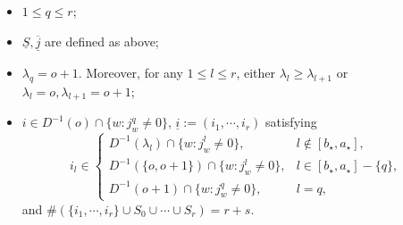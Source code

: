 \documentclass[12pt, a4paper]{article}
\begin{document}
\begin{itemize}
\begin{itemize}
\item $1\leq q\leq r$;

\item $\underline S,\overline{\underline j}$ are defined as above;
    
 \item $\lambda_q=o+1$. Moreover, for any $1\leq l\leq r$, either $\lambda_l\geq\lambda_{l+1}$ or $\lambda_l=o, \lambda_{l+1}=o+1$;
    
    \item $i\in D^{-1}(o)\cap\{w:j^q_w\neq0\}$, $\underline i:=(i_1,\cdots,i_r)$ satisfying
 $$
  i_l\in\left\{
  \begin{matrix}
      D^{-1}(\lambda_l)\cap\{w:j^l_w\neq0\},&l\notin [b_\star,a_\star],\\
      D^{-1}(\{o,o+1\})\cap\{w:j^l_w\neq0\}, &l\in[b_\star,a_\star]-\{q\},\\
      D^{-1}(o+1)\cap\{w:j^q_w\neq0\},&l=q,
  \end{matrix}
  \right.
  $$   
  and $\#(\{i_1,\cdots,i_r\}\cup S_0\cup\cdots\cup S_r)=r+s$.
    \end{itemize}
  

\end{itemize}
\end{document}

